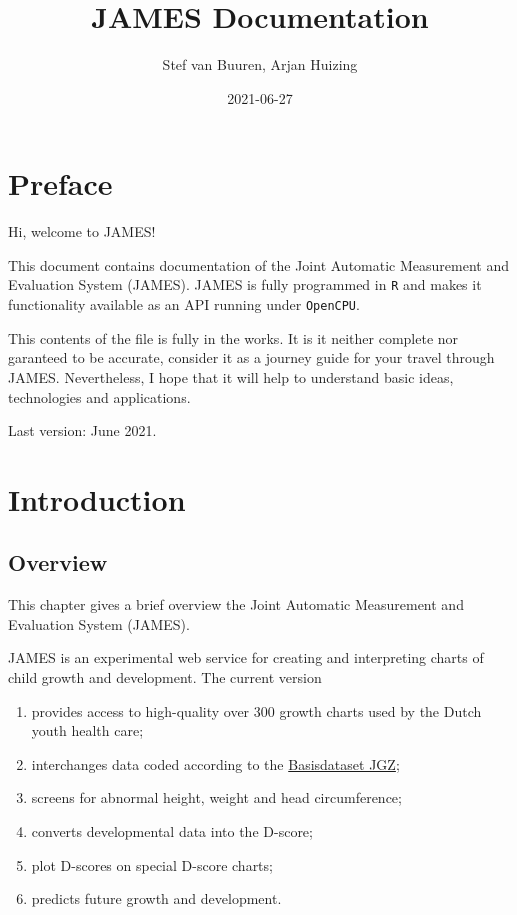\documentclass[
]{book}
\title{JAMES Documentation}
\author{Stef van Buuren, Arjan Huizing}
\date{2021-06-27}
\providecommand{\tightlist}{%
  \setlength{\itemsep}{0pt}\setlength{\parskip}{0pt}}
\begin{document}
\maketitle

{
\setcounter{tocdepth}{1}
\tableofcontents
}
\hypertarget{preface}{%
\chapter*{Preface}\label{preface}}

Hi, welcome to JAMES!

This document contains documentation of the Joint Automatic Measurement and Evaluation System (JAMES). JAMES is fully programmed in \texttt{R} and makes it functionality available as an API running under \texttt{OpenCPU}.

This contents of the file is fully in the works. It is it neither complete nor garanteed to be accurate, consider it as a journey guide for your travel through JAMES. Nevertheless, I hope that it will help to understand basic ideas, technologies and applications.

Last version: June 2021.

\hypertarget{intro}{%
\chapter{Introduction}\label{intro}}

\hypertarget{overview}{%
\section{Overview}\label{overview}}

This chapter gives a brief overview the Joint Automatic Measurement and Evaluation System (JAMES).

JAMES is an experimental web service for creating and interpreting charts of child growth and
development. The current version

\begin{enumerate}
\def\labelenumi{\arabic{enumi}.}
\tightlist
\item
  provides access to high-quality over 300 growth charts used by the Dutch youth health care;
\item
  interchanges data coded according to the \href{https://www.ncj.nl/themadossiers/informatisering/basisdataset/documentatie/?cat=13}{Basisdataset JGZ};
\item
  screens for abnormal height, weight and head circumference;
\item
  converts developmental data into the D-score;
\item
  plot D-scores on special D-score charts;
\item
  predicts future growth and development.
\end{enumerate}
\end{document}
